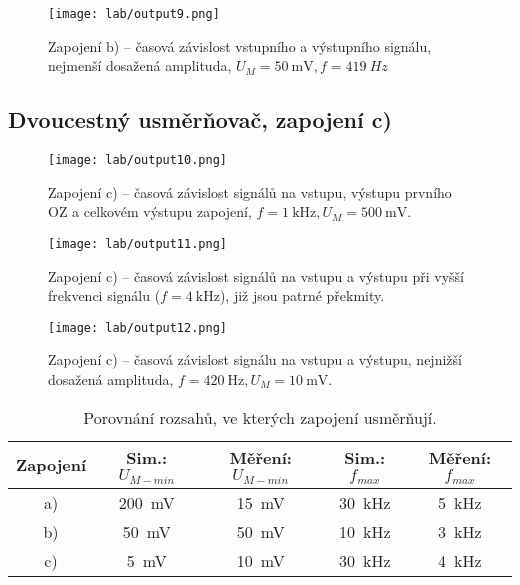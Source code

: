 \begin{figure}[h!]
    \centering
    \texttt{[image: lab/output9.png]}
    \caption{Zapojení b) -- časová závislost vstupního a výstupního signálu, nejmenší dosažená amplituda, \(U_M=\qty{50}{\milli\volt}, f=\qty{419}{Hz}\)}
    \label{fig:lab-output9-png}
\end{figure}

\clearpage
\subsection{Dvoucestný usměrňovač, zapojení c)}
\begin{figure}[h!]
    \centering
    \texttt{[image: lab/output10.png]}
    \caption{Zapojení c) --  časová závislost signálů na vstupu, výstupu prvního OZ a celkovém výstupu zapojení, \(f=\qty{1}{\kilo\hertz}, U_M=\qty{500}{\milli\volt}\).}
    \label{fig:lab-output10-png}
\end{figure}

\begin{figure}[h!]
    \centering
    \texttt{[image: lab/output11.png]}
    \caption{Zapojení c) --  časová závislost signálů na vstupu a výstupu při vyšší frekvenci signálu (\(f=\qty{4}{\kilo\hertz}\)), již jsou patrné překmity.}
    \label{fig:lab-output11-png}
\end{figure}

\begin{figure}[h!]
    \centering
    \texttt{[image: lab/output12.png]}
    \caption{Zapojení c) -- časová závislost signálu na vstupu a výstupu, nejnižší dosažená amplituda, \(f=\qty{420}{\hertz}, U_M=\qty{10}{\milli\volt}\).}
    \label{fig:lab-output12-png}
\end{figure}



\begin{table}[h!]
    \centering
    \def\arraystretch{1.4}
    \caption{Porovnání rozsahů, ve kterých zapojení usměrňují.}
    \begin{tabular}{|c|c|c|c|c|}
        \hline
            Zapojení & Sim.: \(U_{M-min} \)  & Měření: \(U_{M-min} \) & Sim.: \(f_{max} \) & Měření: \(f_{max} \) \\
        \hline
            a) & \qty{200}{\milli\volt} & \qty{15}{\milli\volt} & \qty{30}{\kilo\hertz} & \qty{5}{\kilo\hertz} \\
            b) & \qty{50}{\milli\volt} & \qty{50}{\milli\volt} & \qty{10}{\kilo\hertz} & \qty{3}{\kilo\hertz} \\
            c) & \qty{5}{\milli\volt} & \qty{10}{\milli\volt} & \qty{30}{\kilo\hertz} & \qty{4}{\kilo\hertz} \\
        \hline
    \end{tabular}
    \label{tab:dc-bod}
\end{table}